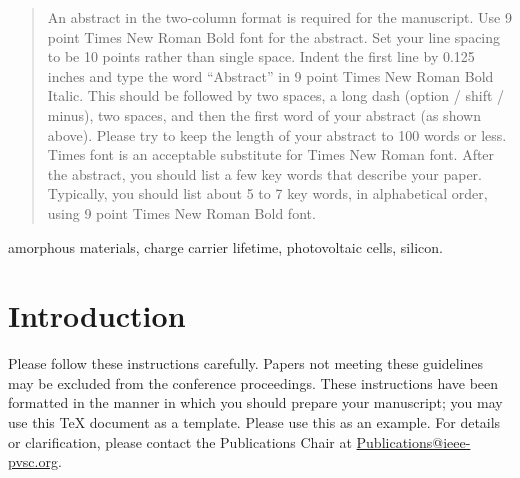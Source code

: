 \documentclass[conference]{IEEEtran}
\begin{document}
\setlength{\columnsep}{0.25in}


\maketitle


\begin{abstract}
An abstract in the two-column format is required for the manuscript. Use 9 point Times New Roman Bold font for the abstract. Set your line spacing to be 10 points rather than single space. Indent the first line by 0.125 inches and type the word ``Abstract'' in 9 point Times New Roman Bold Italic. This should be followed by two spaces, a long dash (option / shift / minus), two spaces, and then the first word of your abstract (as shown above). Please try to keep the length of your abstract to 100 words or less. Times font is an acceptable substitute for Times New Roman font. After the abstract, you should list a few key words that describe your paper. Typically, you should list about 5 to 7 key words, in alphabetical order, using 9 point Times New Roman Bold font.
\end{abstract}
\begin{IEEEkeywords}
amorphous materials, charge carrier lifetime, photovoltaic cells, silicon.
\end{IEEEkeywords}




%
\IEEEpeerreviewmaketitle



\section{Introduction}
Please follow these instructions carefully.  Papers not meeting these guidelines may be excluded from the conference proceedings.  These instructions have been formatted in the manner in which you should prepare your manuscript; you may use this TeX document as a template.  Please use this as an example.  For details or clarification, please contact the Publications Chair at \url{Publications@ieee-pvsc.org}. 
\end{document}
